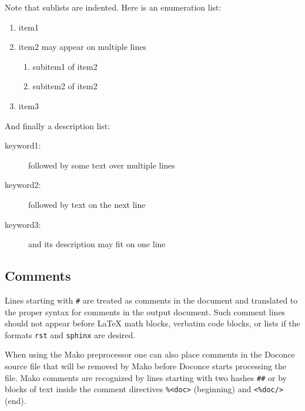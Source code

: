\documentclass[twoside]{article}
\begin{document}
\noindent
Note that sublists are indented.
Here is an enumeration list:

\begin{enumerate}
\item item1

\item item2
   may appear on
   multiple lines
\begin{enumerate}

 \item subitem1 of item2

 \item subitem2 of item2

\end{enumerate}

\noindent
\item item3
\end{enumerate}

\noindent
And finally a description list:

\begin{description}
 \item[keyword1:] 
   followed by
   some text
   over multiple
   lines

 \item[keyword2:] 
   followed by text on the next line

 \item[keyword3:] 
   and its description may fit on one line
\end{description}

\noindent

\subsection{Comments}

Lines starting with {\fontsize{10pt}{10pt}\verb!#!} are treated as comments in the document and
translated to the proper syntax for comments in the output
document. Such comment lines should not appear before {\LaTeX} math
blocks, verbatim code blocks, or lists if the formats {\fontsize{10pt}{10pt}\verb!rst!} and
{\fontsize{10pt}{10pt}\verb!sphinx!} are desired.

When using the Mako preprocessor one can also place comments in
the Doconce source file that will be removed by Mako before
Doconce starts processing the file. Mako comments are recognized
by lines starting with two hashes {\fontsize{10pt}{10pt}\verb!##!} or by blocks of text
inside the comment directives {\fontsize{10pt}{10pt}\verb!%<doc>!} (beginning) and {\fontsize{10pt}{10pt}\verb!<%doc/>!} (end).
\end{document}
